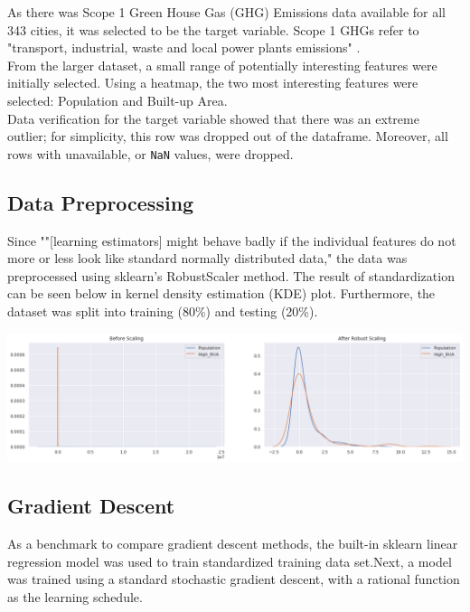 \documentclass[onecolumn]{article}
\newcommand{\cc}[1]{\texttt{#1}}
\begin{document}
As there was Scope 1 Green House Gas (GHG) Emissions data available for all 343 cities, it was selected to be the target variable. Scope 1 GHGs refer to "transport, industrial, waste and local power plants emissions" \cite{nangini2019global}. \\

From the larger dataset, a small range of potentially interesting features were initially selected. Using a heatmap, the two most interesting features were selected: Population and Built-up Area. \\

Data verification for the target variable showed that there was an extreme outlier; for simplicity, this row was dropped out of the dataframe. Moreover, all rows with unavailable, or \cc{NaN} values, were dropped.  

\subsection{Data Preprocessing}

Since ""[learning estimators] might behave badly if the individual features do not more or less look like standard normally distributed data," \cite{sklearnpreprocessing} the data was preprocessed using sklearn's RobustScaler method. The result of standardization can be seen below in kernel density estimation (KDE) plot. Furthermore, the dataset was split into training (80\%) and testing (20\%).

\begingroup
    \centering
    \medskip
    \includegraphics[width=\columnwidth]{Tex/mp1_images/scaling.png}
    \medskip
\endgroup
\medskip


\subsection{Gradient Descent}

As a benchmark to compare gradient descent methods, the built-in sklearn linear regression model was used to train standardized training data set.Next, a model was trained using a standard stochastic gradient descent, with a rational function as the learning schedule. \\
\end{document}
